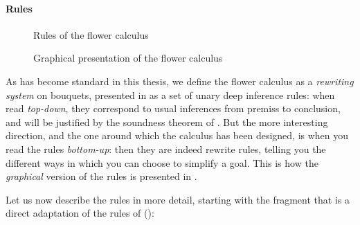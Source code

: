 \paragraph{Rules}

\begin{figure*}
  
  \caption{Rules of the flower calculus}
\end{figure*}

\begin{figure*}
  
  \caption{Graphical presentation of the flower calculus}
\end{figure*}

As has become standard in this thesis, we define the flower calculus as a
\emph{rewriting system} on bouquets, presented in  as a
set of unary deep inference rules: when read \emph{top-down}, they correspond to
usual inferences from premiss to conclusion, and will be justified by the
soundness theorem of .
But the more interesting direction, and the one around which the calculus has
been designed, is when you read the rules \emph{bottom-up}: then they are indeed
rewrite rules, telling you the different ways in which you can choose to
simplify a goal. This is how the \emph{graphical} version of the rules is
presented in .

Let us now describe the rules in more detail, starting with the fragment that is
a direct adaptation of the rules of  ():

